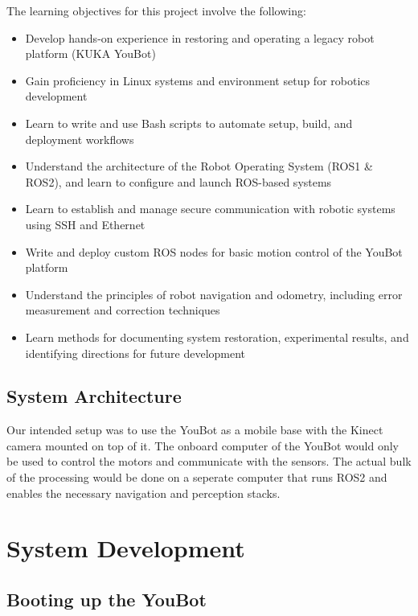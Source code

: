 \documentclass[a4paper, 12pt]{article}
\newif\ifshownotes
\newcommand{\notes}[1]{\ifshownotes\textcolor{blue}{#1}\fi}
\begin{document}
    The learning objectives for this project involve the following:
    \begin{itemize}
        \item Develop hands-on experience in restoring and operating a legacy robot platform (KUKA YouBot)
        \item Gain proficiency in Linux systems and environment setup for robotics development
        \item Learn to write and use Bash scripts to automate setup, build, and deployment workflows
        \item Understand the architecture of the Robot Operating System (ROS1 \& ROS2), and learn to configure and launch ROS-based systems
        \item Learn to establish and manage secure communication with robotic systems using SSH and Ethernet
        \item Write and deploy custom ROS nodes for basic motion control of the YouBot platform
        \item Understand the principles of robot navigation and odometry, including error measurement and correction techniques
        \item Learn methods for documenting system restoration, experimental results, and identifying directions for future development
    \end{itemize}

    \subsection{System Architecture}
    Our intended setup was to use the YouBot as a mobile base with the Kinect camera mounted on top of it. The onboard computer of the YouBot would only be used to control the motors and communicate with the sensors. The actual bulk of the processing would be done on a seperate computer that runs ROS2 and enables the necessary navigation and perception stacks.  

    \pagebreak

    \section{System Development}
    \subsection{Booting up the YouBot}

    \notes{describe the booting up process here, what ports to use, how to connect to the onboard computer, etc.}
\end{document}
